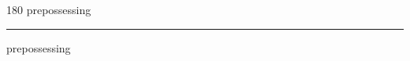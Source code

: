 
\begin{frame}
\begin{center}
\begin{turn}{180}
{\fontsize{2.5cm}{1em}\selectfont prepossessing}
\end{turn}
\vspace{1em}\par  
\hrule
\vspace{1em}\par  
{\fontsize{2.5cm}{1em}\selectfont prepossessing}
\end{center}
\end{frame}
